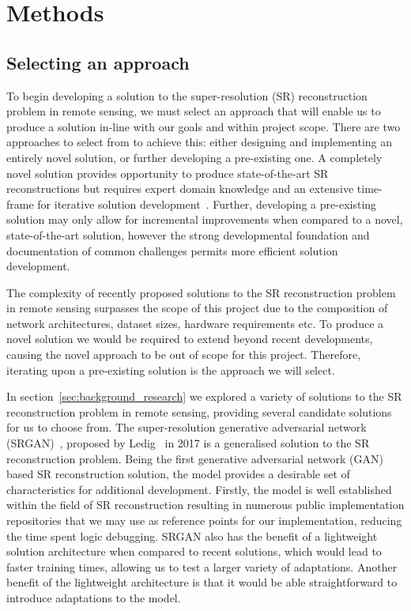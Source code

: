 \chapter{Methods}\label{chapter2}
\section{Selecting an approach}\label{sec:selecting_an_approach}
To begin developing a solution to the super-resolution (SR) reconstruction problem in remote sensing, we must select an approach that will enable us to produce a solution in-line with our goals and within project scope. There are two approaches to select from to achieve this: either designing and implementing an entirely novel solution, or further developing a pre-existing one. A completely novel solution provides opportunity to produce state-of-the-art SR reconstructions but requires expert domain knowledge and an extensive time-frame for iterative solution development~\cite{ref}. Further, developing a pre-existing solution may only allow for incremental improvements when compared to a novel, state-of-the-art solution, however the strong developmental foundation and documentation of common challenges permits more efficient solution development.

The complexity of recently proposed solutions to the SR reconstruction problem in remote sensing surpasses the scope of this project due to the composition of network architectures, dataset sizes, hardware requirements etc. To produce a novel solution we would be required to extend beyond recent developments, causing the novel approach to be out of scope for this project. Therefore, iterating upon a pre-existing solution is the approach we will select.

In section~\ref{sec:background_research} we explored a variety of solutions to the SR reconstruction problem in remote sensing, providing several candidate solutions for us to choose from. The super-resolution generative adversarial network (SRGAN)~\cite{srgan}, proposed by Ledig \etal\ in 2017 is a generalised solution to the SR reconstruction problem. Being the first generative adversarial network (GAN) based SR reconstruction solution, the model provides a desirable set of characteristics for additional development. Firstly, the model is well established within the field of SR reconstruction resulting in numerous public implementation repositories that we may use as reference points for our implementation, reducing the time spent logic debugging. SRGAN also has the benefit of a lightweight solution architecture when compared to recent solutions, which would lead to faster training times, allowing us to test a larger variety of adaptations. Another benefit of the lightweight architecture is that it would be able straightforward to introduce adaptations to the model. 

